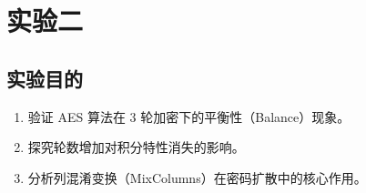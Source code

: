 \section{实验二}
\subsection{实验目的}
\begin{enumerate}
    \item 验证 AES 算法在 3 轮加密下的平衡性（Balance）现象。
    \item 探究轮数增加对积分特性消失的影响。
    \item 分析列混淆变换（MixColumns）在密码扩散中的核心作用。
\end{enumerate}